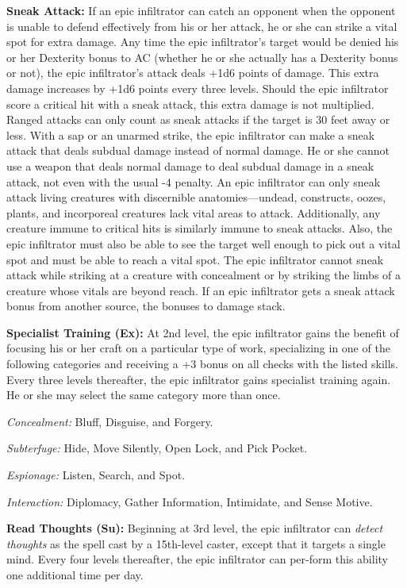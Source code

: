 \documentclass{article}
\begin{document}
\textbf{Sneak Attack:} If an epic infiltrator can catch an opponent when the opponent 
is unable to defend effectively from his or her attack, he or she can strike a 
vital spot for extra damage. Any time the epic infiltrator's target would be denied 
his or her Dexterity bonus to AC (whether he or she actually has a Dexterity bonus 
or not), the epic infiltrator's attack deals +1d6 points of damage. This extra 
damage increases by +1d6 points every three levels. Should the epic infiltrator 
score a critical hit with a sneak attack, this extra damage is not multiplied. 
Ranged attacks can only count as sneak attacks if the target is 30 feet away or 
less. With a sap or an unarmed strike, the epic infiltrator can make a sneak attack 
that deals subdual damage instead of normal damage. He or she cannot use a weapon 
that deals normal damage to deal subdual damage in a sneak attack, not even with 
the usual -4 penalty. An epic infiltrator can only sneak attack living creatures 
with discernible anatomies---undead, constructs, oozes, plants, and incorporeal 
creatures lack vital areas to attack. Additionally, any creature immune to critical 
hits is similarly immune to sneak attacks. Also, the epic infiltrator must also 
be able to see the target well enough to pick out a vital spot and must be able 
to reach a vital spot. The epic infiltrator cannot sneak attack while striking 
at a creature with concealment or by striking the limbs of a creature whose vitals 
are beyond reach. If an epic infiltrator gets a sneak attack bonus from another 
source, the bonuses to damage stack. 

\textbf{Specialist Training (Ex):} At 2nd level, the epic infiltrator gains the 
benefit of focusing his or her craft on a particular type of work, specializing 
in one of the following categories and receiving a +3 bonus on all checks with 
the listed skills. Every three levels thereafter, the epic infiltrator gains specialist 
training again. He or she may select the same category more than once. 

\textit{Concealment: }Bluff, Disguise, and Forgery. 

\textit{Subterfuge: }Hide, Move Silently, Open Lock, and Pick Pocket. 

\textit{Espionage: }Listen, Search, and Spot. 

\textit{Interaction: }Diplomacy, Gather Information, Intimidate, and Sense Motive. 

\textbf{Read Thoughts (Su):} Beginning at 3rd level, the epic infiltrator can \textit{detect 
thoughts }as the spell cast by a 15th-level caster, except that it targets a single 
mind. Every four levels thereafter, the epic infiltrator can per-form this ability 
one additional time per day. 
\end{document}
